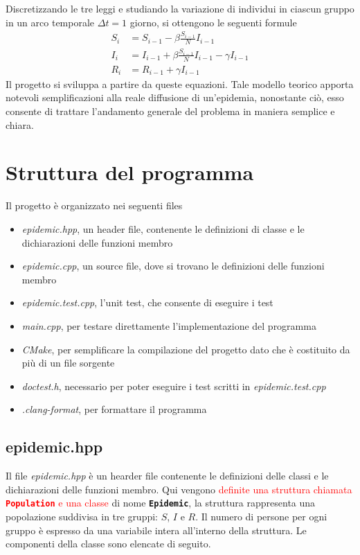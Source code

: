 \documentclass[11pt, a4paper, left=3.5cm, right=3.5cm]{article}
\begin{document}
Discretizzando le tre leggi e studiando la variazione di individui in ciascun 
gruppo in un arco temporale $\Delta t=1$ giorno, si ottengono le seguenti formule
\begin{equation}
\begin{align*} 
S_i &= S_{i-1} - \beta \frac{S_{i-1}}{N} I_{i-1} \\
I_i &= I_{i-1} + \beta \frac{S_{i-1}}{N} I_{i-1} - \gamma I_{i-1} \\
R_i &= R_{i-1} + \gamma I_{i-1} 
\end{align*}
\end{equation}
Il progetto si sviluppa a partire da queste equazioni.
Tale modello teorico apporta notevoli semplificazioni alla reale 
diffusione di un'epidemia, nonostante ci\`{o}, esso consente di trattare 
l'andamento generale del problema in maniera semplice e chiara.

\section{Struttura del programma}
Il progetto \`{e} organizzato nei seguenti files 
\begin{itemize}
\item \textit{epidemic.hpp}, un header file, contenente le definizioni di classe e le dichiarazioni delle funzioni membro 
\item \textit{epidemic.cpp}, un source file, dove si trovano le definizioni delle funzioni membro
\item \textit{epidemic.test.cpp}, l'unit test, che consente di eseguire i test
\item \textit{main.cpp}, per testare direttamente l'implementazione del programma
\item \textit{CMake}, per semplificare la compilazione del progetto dato che è costituito da pi\`{u} di un file sorgente
\item \textit{doctest.h}, necessario per poter eseguire i test scritti in 
\textit{epidemic.test.cpp}
\item \textit{.clang-format}, per formattare il programma
\end{itemize}


\subsection{epidemic.hpp}
Il file \textit{epidemic.hpp} è un hearder file contenente le definizioni delle classi e le dichiarazioni delle funzioni membro. Qui vengono \textcolor{red}{definite una struttura chiamata \textbf{\texttt{Population}} e una classe} di nome \textbf{\texttt{Epidemic}}, la struttura rappresenta una popolazione suddivisa in tre gruppi: $S$, $I$ e $R$. Il numero di persone per ogni gruppo è espresso da una variabile intera all'interno della struttura. Le componenti della classe sono elencate di seguito. \\
\end{document}
